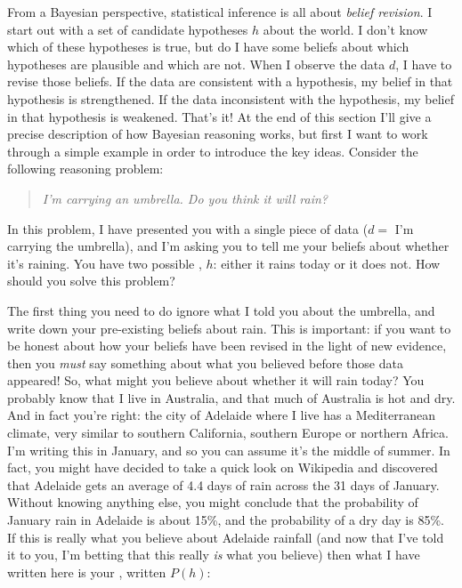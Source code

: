 From a Bayesian perspective, statistical inference is all about {\it belief revision}. I start out with a set of candidate hypotheses $h$ about the world. I don't know which of these hypotheses is true, but do I have some beliefs about which hypotheses are plausible and which are not. When I observe the data $d$, I have to revise those beliefs. If the data are consistent with a hypothesis, my belief in that hypothesis is strengthened. If the data inconsistent with the hypothesis, my belief in that hypothesis is weakened. That's it! At the end of this section I'll give a precise description of how Bayesian reasoning works, but first I want to work through a simple example in order to introduce the key ideas. Consider the following reasoning problem:
\begin{quote}
{\it I'm carrying an umbrella. Do you think it will rain?}
\end{quote}
In this problem, I have presented you with a single piece of data ($d =$ I'm carrying the umbrella), and I'm asking you to tell me your beliefs about whether it's raining. You have two possible , $h$: either it rains today or it does not. How should you solve this problem? 


The first thing you need to do ignore what I told you about the umbrella, and write down your pre-existing beliefs about rain. This is important: if you want to be honest about how your beliefs have been revised in the light of new evidence, then you {\it must} say something about what you believed before those data appeared! So, what might you believe about whether it will rain today? You probably know that I live in Australia, and that much of Australia is hot and dry. And in fact you're right: the city of Adelaide where I live has a Mediterranean climate, very similar to southern California, southern Europe or northern Africa. I'm writing this in January, and so you can assume it's the middle of summer. In fact, you might have decided to take a quick look on Wikipedia and discovered that Adelaide gets an average of 4.4 days of rain across the 31 days of January. Without knowing anything else, you might conclude that the probability of January rain in Adelaide is about 15\%, and the probability of a dry day is 85\%. If this is really what you believe about Adelaide rainfall (and now that I've told it to you, I'm betting that this really {\it is} what you believe) then what I have written here is your , written $P(h)$:

